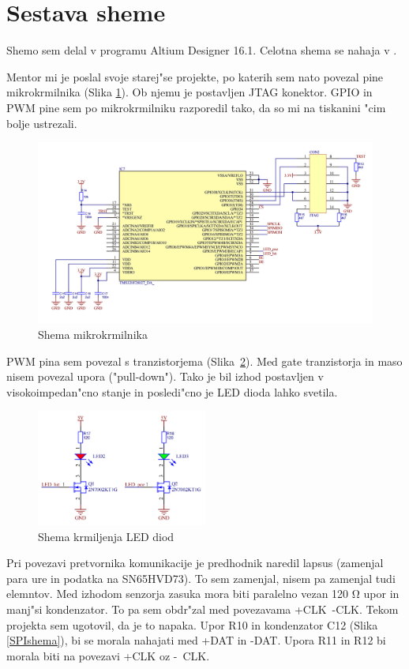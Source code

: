 \documentclass[a4paper]{article}
\begin{document}
\section{Sestava sheme}
\label{shema}
Shemo sem delal v programu Altium Designer 16.1. Celotna shema se nahaja v .




Mentor mi je poslal svoje starej"se projekte, po katerih sem nato povezal pine mikrokrmilnika (Slika \ref{fig:uCshema}). Ob njemu je postavljen JTAG konektor. GPIO in PWM pine sem po mikrokrmilniku razporedil tako, da so mi na tiskanini "cim bolje ustrezali.
	\begin{figure}[h!]
		\centering
		\includegraphics[width=\textwidth]{uC.png}
		\caption{Shema mikrokrmilnika}
		\label{fig:uCshema}
	\end{figure}


PWM pina sem povezal s tranzistorjema (Slika~\ref{fig:LEDshema}). Med gate tranzistorja in maso nisem povezal upora ("pull-down"). Tako je bil izhod postavljen v visokoimpedan"cno stanje in posledi"cno je LED dioda lahko svetila.

	\begin{figure}[h!]
		\centering
		\includegraphics[width=0.5\textwidth ]{LED.png}
		\caption{Shema krmiljenja LED diod}
		 \label{fig:LEDshema}
	\end{figure}
Pri povezavi pretvornika komunikacije je predhodnik naredil lapsus (zamenjal para ure in podatka na SN65HVD73). To sem zamenjal, nisem pa zamenjal tudi elemntov. Med izhodom senzorja zasuka mora biti paralelno vezan 120 $\mathrm{\Omega}$ upor in manj"si kondenzator. To pa sem obdr"zal med povezavama +CLK~-CLK. Tekom projekta sem ugotovil, da je to napaka. Upor R10 in kondenzator C12 (Slika \ref{SPIshema}), bi se morala nahajati med +DAT in -DAT. Upora R11 in R12 bi morala biti na povezavi +CLK oz -~CLK.
\end{document}
